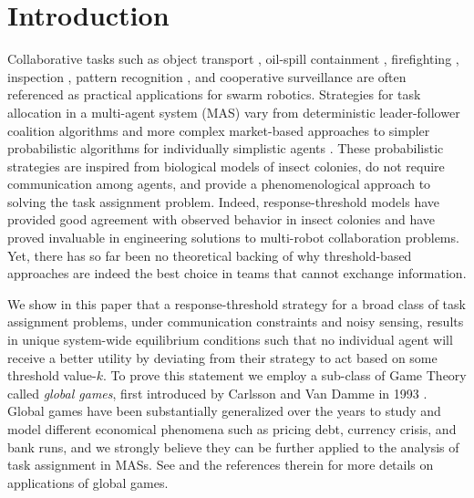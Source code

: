 \documentclass[conference]{ieeeconf}
\begin{document}
\section{Introduction}\label{sec:intro}
Collaborative tasks such as object transport \cite{Sugawara2012}, oil-spill containment \cite{Beni2005}, firefighting \cite{Kanakia2014}, inspection \cite{correll2007coordination}, pattern recognition \cite{Beni1993}, and cooperative surveillance are often referenced as practical applications for swarm robotics. Strategies for task allocation \cite{Gerkey2004} in a multi-agent system (MAS) vary from deterministic leader-follower coalition algorithms \cite{Chen2011} and more complex market-based approaches \cite{Amstutz2008} to simpler probabilistic algorithms for individually simplistic agents \cite{Dantu2012}. These probabilistic strategies are inspired from biological models of insect colonies, do not require communication among agents, and provide a phenomenological approach to solving the task assignment problem. Indeed, response-threshold models have provided good agreement with observed behavior in insect colonies and have proved invaluable in engineering solutions to multi-robot collaboration problems. Yet, there has so far been no theoretical backing of why threshold-based approaches are indeed the best choice in teams that cannot exchange information.

We show in this paper that a response-threshold strategy for a broad class of task assignment problems, under communication constraints  and noisy sensing, results in unique system-wide equilibrium conditions such that no individual agent will receive a better utility by deviating from their strategy to act based on some threshold value-$k$. To prove this statement we employ a sub-class of Game Theory called \emph{global games}, first introduced by Carlsson and Van Damme in 1993 \cite{Carlsson1993}. Global games have been substantially generalized over the years to study and model different economical phenomena such as pricing debt, currency crisis, and bank runs, and we strongly believe they can be further applied to the analysis of task assignment in MASs. See \cite{Morris2000} and the references therein for more details on applications of global games.
\end{document}
